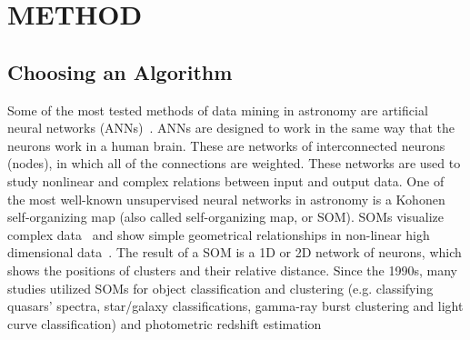 
\section{METHOD}
\label{sec: method}
\subsection{Choosing an Algorithm}

Some of the most tested methods of data mining in astronomy are artificial neural networks (ANNs)~\citep[e.g.][and references therein]{Hossein14,Hossein16}.
ANNs are designed to work in the same way that the neurons work in a human brain.
These are networks of interconnected neurons (nodes), in which all of the connections are weighted.
These networks are used to study nonlinear and complex relations between input and output data.
One of the most well-known unsupervised neural networks in astronomy is a Kohonen self-organizing map (also called self-organizing map, or SOM).
SOMs visualize complex data~\citep{Kohonen82} and show simple geometrical relationships in non-linear high dimensional data~\citep{Kohonen98}.
The result of a SOM is a 1D or 2D network of neurons, which shows the positions of clusters and their relative distance.
Since the 1990s, many studies utilized SOMs for object classification and clustering (e.g. classifying quasars' spectra, star/galaxy classifications, gamma-ray burst clustering and light curve classification) and photometric redshift estimation~\citep[e.g.][]{Odewahn92, Hernandez94, Murtagh95, Maehoenen95,Scaringi09,Geach12,Fustes13,Meusinger16,Rahmani16b} %

